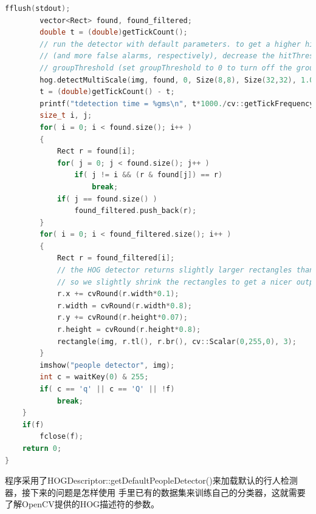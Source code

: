 \documentclass[10pt,technote,onecolumn,twoside]{IEEEtran}
\begin{document}
\begin{lstlisting}[language=C++]
        fflush(stdout);
        vector<Rect> found, found_filtered;
        double t = (double)getTickCount();
        // run the detector with default parameters. to get a higher hit-rate
        // (and more false alarms, respectively), decrease the hitThreshold and
        // groupThreshold (set groupThreshold to 0 to turn off the grouping completely).
        hog.detectMultiScale(img, found, 0, Size(8,8), Size(32,32), 1.05, 2);
        t = (double)getTickCount() - t;
        printf("tdetection time = %gms\n", t*1000./cv::getTickFrequency());
        size_t i, j;
        for( i = 0; i < found.size(); i++ )
        {
            Rect r = found[i];
            for( j = 0; j < found.size(); j++ )
                if( j != i && (r & found[j]) == r)
                    break;
            if( j == found.size() )
                found_filtered.push_back(r);
        }
        for( i = 0; i < found_filtered.size(); i++ )
        {
            Rect r = found_filtered[i];
            // the HOG detector returns slightly larger rectangles than the real objects.
            // so we slightly shrink the rectangles to get a nicer output.
            r.x += cvRound(r.width*0.1);
            r.width = cvRound(r.width*0.8);
            r.y += cvRound(r.height*0.07);
            r.height = cvRound(r.height*0.8);
            rectangle(img, r.tl(), r.br(), cv::Scalar(0,255,0), 3);
        }
        imshow("people detector", img);
        int c = waitKey(0) & 255;
        if( c == 'q' || c == 'Q' || !f)
            break;
    }
    if(f)
        fclose(f);
    return 0;
}
\end{lstlisting}

程序采用了\textsf{HOGDescriptor::getDefaultPeopleDetector()}来加载默认的行人检测器，接下来的问题是怎样使用
手里已有的数据集来训练自己的分类器，这就需要了解OpenCV提供的HOG描述符的参数。
\end{document}
